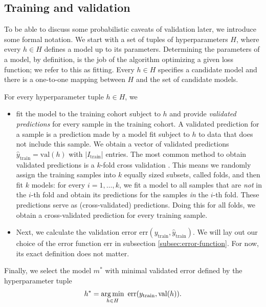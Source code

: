 \subsection{Training and validation}\label{subsec:train-val}

To be able to discuss some probabilistic caveats of validation later, we introduce some formal 
notation. We start with a set of tuples of hyperparameters $H$, where every $h \in H$ defines a model
up to its parameters. Determining the parameters of a model, by definition, is the job of the 
algorithm optimizing a given loss function; we refer to this as fitting. Every $h \in H$ specifies 
a candidate model and there is a one-to-one mapping between $H$ and the set of candidate models.

For every hyperparameter tuple $h \in H$, we
\begin{itemize}
    \item fit the model to the training cohort subject to $h$ and provide 
        \textit{validated predictions} for 
        every sample in the training cohort.
        A validated prediction for a sample is a prediction made by a model fit 
        subject to $h$ to data that does not include this sample. We obtain a vector of validated 
        predictions $\hat{y}_\text{train} = \text{val}(h)$ with $|I_\text{train}$| entries.
        The most common method to obtain validated predictions is a $k$-fold cross validation 
        \cite{stone74}.
        This means we randomly assign the training samples into $k$ equally sized subsets, called 
        folds, and then fit $k$ models: for every $i = 1, \ldots, k$, we fit a model to all 
        samples that are \textit{not} in the $i$-th fold and obtain its predictions for the samples 
        \textit{in} the $i$-th fold. These predictions serve as (cross-validated) predictions. 
        Doing this for all 
        folds, we obtain a cross-validated prediction for every training sample.
    \item Next, we calculate the validation error 
        $\text{err}(y_\text{train}, \hat{y}_\text{train})$. We will lay out our choice of the 
        error function $\text{err}$ in subsection \ref{subsec:error-function}. For now, its 
        exact definition does not matter.
\end{itemize}
Finally, we select the model $m^*$ with minimal validated error defined by the hyperparameter tuple 
\begin{align}
    h^* = \operatorname*{arg\,min}_{h \in H} \ \text{err}(y_\text{train}, \text{val}(h)).
\end{align}

